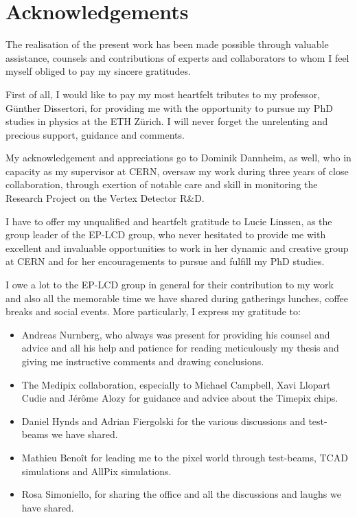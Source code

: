 \chapter{Acknowledgements}
\label{sec:ack}

The realisation of the present work has been made possible through
valuable assistance, counsels and contributions of experts and
collaborators to whom I feel myself obliged to pay my sincere
gratitudes.

First of all, I would like to pay my most heartfelt tributes to my
professor, Günther Dissertori, for providing me with the opportunity
to pursue my PhD studies in physics at the ETH Zürich. I will never
forget the unrelenting and precious support, guidance and comments.


My acknowledgement and appreciations go to Dominik Dannheim, as well,
who in capacity as my supervisor at CERN, oversaw my work during three
years of close collaboration, through exertion of notable care and
skill in monitoring the Research Project on the Vertex Detector R\&D.

I have to offer my unqualified and heartfelt gratitude to Lucie
Linssen, as the group leader of the EP-LCD group, who never hesitated
to provide me with excellent and invaluable opportunities to work in
her dynamic and creative group at CERN and for her encouragements to
pursue and fulfill my PhD studies.

I owe a lot to the EP-LCD group in general for their contribution to
my work and also all the memorable time we have shared during
gatherings lunches, coffee breaks and social events. More
particularly, I express my gratitude to:

\begin{itemize}
\item Andreas Nurnberg, who always was present for providing his
  counsel and advice and all his help and patience for reading
  meticulously my thesis and giving me instructive comments and
  drawing conclusions.

\item The Medipix collaboration, especially to Michael Campbell, Xavi
  Llopart Cudie and Jérôme Alozy for guidance and advice about the
  Timepix chips.

\item Daniel Hynds and Adrian Fiergolski for the various discussions
  and test-beams we have shared.

\item Mathieu Benoît for leading me to the pixel world through
  test-beams, TCAD simulations and AllPix simulations.

\item Rosa Simoniello, for sharing the office and all the discussions
  and laughs we have shared.
\end{itemize}

